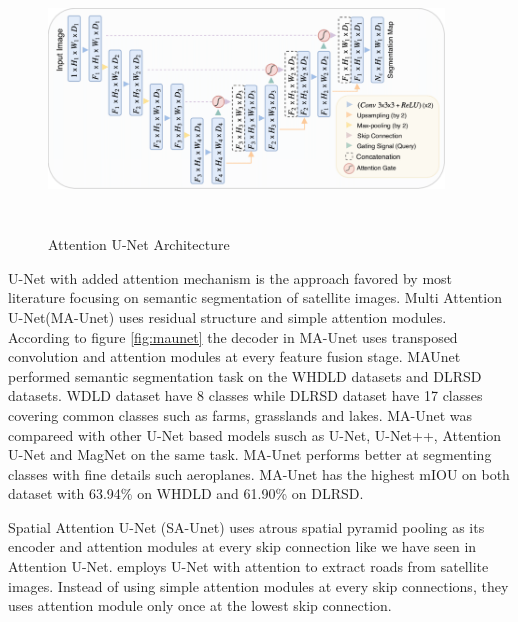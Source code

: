 \begin{figure}[ht]
\includegraphics[width=10.5cm, height=7cm]{images/attention-unet.png}
\centering
\caption{Attention U-Net Architecture \protect\cite{attention-unet}}
\label{fig:attention-unet}
\end{figure}

U-Net with added attention mechanism is the approach favored by most literature focusing on semantic segmentation of satellite images. Multi Attention U-Net(MA-Unet) \cite{multi-attention-unet}  uses residual structure and simple attention modules. According to figure \ref{fig:maunet} the decoder in MA-Unet uses transposed convolution and attention modules at every feature fusion stage. MAUnet performed semantic segmentation task on the WHDLD datasets and DLRSD datasets. WDLD dataset have 8 classes while DLRSD dataset have 17 classes covering common classes such as farms, grasslands and lakes. MA-Unet was compareed with other U-Net based models susch as U-Net, U-Net++, Attention U-Net and MagNet on the same task. MA-Unet performs better at segmenting classes with fine details such aeroplanes. MA-Unet has the highest mIOU on both dataset with 63.94\% on WHDLD and 61.90\% on DLRSD.

Spatial Attention U-Net (SA-Unet) \cite{improved-unet} uses atrous spatial pyramid pooling as its encoder and attention modules at every skip connection like we have seen in Attention U-Net.  \cite{attention-unet-road} employs U-Net with attention to extract roads from satellite images. Instead of using simple attention modules at every skip connections, they uses attention module only once at the lowest skip connection.

